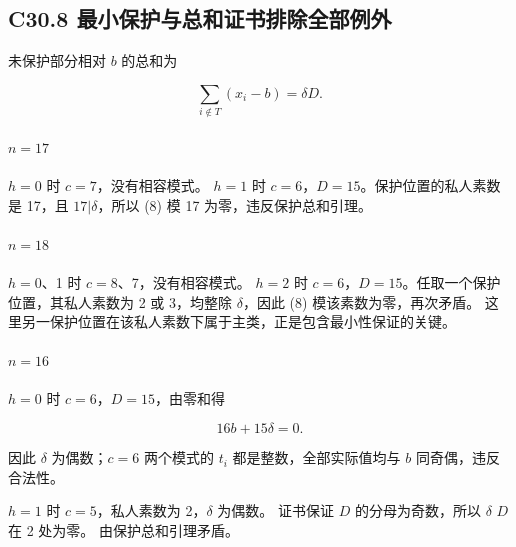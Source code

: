 \subsection*{\texorpdfstring{{C30.8} {最小保护与总和证书排除全部例外}}{C30.8 最小保护与总和证书排除全部例外}}\label{C30-h198}

{未保护部分相对} {\ensuremath{b}} {的总和为}

\[
\sum_{i\notin T}(x_i-b)=\delta D.
\tag{C30.8}
\]

\paragraph*{\texorpdfstring{{\ensuremath{n=17}}}{}}\label{C30-h199}

{\ensuremath{h=0}} {时} {\ensuremath{c=7}，没有相容模式。} {\ensuremath{h=1}} {时} {\ensuremath{c=6}，\ensuremath{D=15}。保护位置的私人素数是} {17，且} {\ensuremath{17|\delta }，所以} {(8)} {模} {17} {为零，违反保护总和引理。}

\paragraph*{\texorpdfstring{{\ensuremath{n=18}}}{}}\label{C30-h200}

{\ensuremath{h=0}、1} {时} {\ensuremath{c=8}、7，没有相容模式。} {\ensuremath{h=2}} {时} {\ensuremath{c=6}，\ensuremath{D=15}。任取一个保护位置，其私人素数为} {2} {或} {3，均整除} {\ensuremath{\delta }，因此} {(8)} {模该素数为零，再次矛盾。} {这里另一保护位置在该私人素数下属于主类，正是包含最小性保证的关键。}

\paragraph*{\texorpdfstring{{\ensuremath{n=16}}}{}}\label{C30-h201}

{\ensuremath{h=0}} {时} {\ensuremath{c=6}，\ensuremath{D=15}，由零和得}

\[
16b+15\delta=0.
\]

{因此} {\ensuremath{\delta }} {为偶数；\ensuremath{c=6}} {两个模式的} {\ensuremath{t_{i}}} {都是整数，全部实际值均与} {\ensuremath{b}} {同奇偶，违反合法性。}

{\ensuremath{h=1}} {时} {\ensuremath{c=5}，私人素数为} {2，\ensuremath{\delta }} {为偶数。} {证书保证} {\ensuremath{D}} {的分母为奇数，所以} {\ensuremath{\delta }} {\ensuremath{D}} {在} {2} {处为零。} {由保护总和引理矛盾。}

